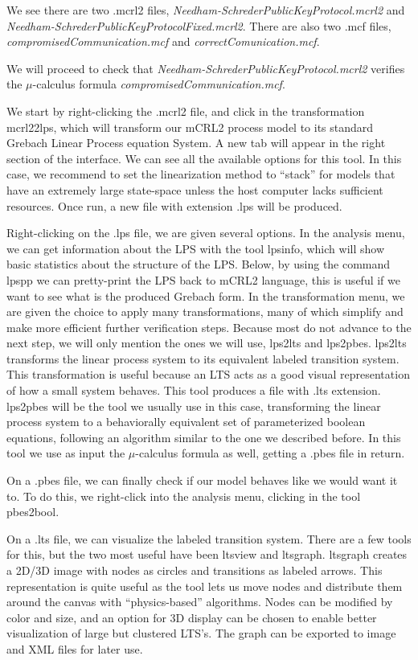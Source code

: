 \documentclass[11pt]{article}
\theoremstyle{definition}
\theoremstyle{plain}
\theoremstyle{definition}
\begin{document}
We see there are two .mcrl2 files, \textit{Needham-SchrederPublicKeyProtocol.mcrl2} and \textit{Needham-SchrederPublicKeyProtocolFixed.mcrl2}. There are also two .mcf files, \textit{compromisedCommunication.mcf} and \textit{correctComunication.mcf}.

We will proceed to check that \textit{Needham-SchrederPublicKeyProtocol.mcrl2} verifies the $ \mu $-calculus formula \textit{compromisedCommunication.mcf}.

We start by right-clicking the .mcrl2 file, and click in the transformation mcrl22lps, which will transform our mCRL2 process model to its standard Grebach Linear Process equation System. A new tab will appear in the right section of the interface. We can see all the available options for this tool. In this case, we recommend to set the linearization method to ``stack'' for models that have an extremely large state-space unless the host computer lacks sufficient resources. Once run, a new file with extension .lps will be produced.


Right-clicking on the .lps file, we are given several options. In the analysis menu, we can get information about the LPS with the tool lpsinfo, which will show basic statistics about the structure of the LPS. Below, by using the command lpspp we can pretty-print the LPS back to mCRL2 language, this is useful if we want to see what is the produced Grebach form. In the transformation menu, we are given the choice to apply many transformations, many of which simplify and make more efficient further verification steps. Because most do not advance to the next step, we will only mention the ones we will use, lps2lts and lps2pbes.
lps2lts transforms the linear process system to its equivalent labeled transition system. This transformation is useful because an LTS acts as a good visual representation of how a small system behaves. This tool produces a file with .lts extension.
lps2pbes will be the tool we usually use in this case, transforming the linear process system to a behaviorally equivalent set of parameterized boolean equations, following an algorithm similar to the one we described before. In this tool we use as input the $ \mu $-calculus formula as well, getting a .pbes file in return.

On a .pbes file, we can finally check if our model behaves like we would want it to. To do this, we right-click into the analysis menu, clicking in the tool pbes2bool.

On a .lts file, we can visualize the labeled transition system. There are a few tools for this, but the two most useful have been ltsview and ltsgraph.
ltsgraph creates a 2D/3D image with nodes as circles and transitions as labeled arrows. This representation is quite useful as the tool lets us move nodes and distribute them around the canvas with ``physics-based'' algorithms. Nodes can be modified by color and size, and an option for 3D display can be chosen to enable better visualization of large but clustered LTS's. The graph can be exported to image and XML files for later use.
\end{document}
